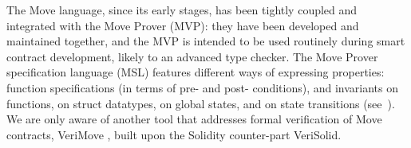 
The Move language, since its early stages, has been tightly coupled and integrated with the Move Prover (MVP): they have been developed and maintained together, and the MVP is intended to be used routinely during smart contract development, likely to an advanced type checker.
The Move Prover specification language (MSL) \cite{aptos-msl,Xu24langsec} features different ways of expressing properties: function specifications (in terms of pre- and post- conditions), and invariants on functions, on struct datatypes, on global states, and on state transitions (see~).
%
We are only aware of  another tool that addresses formal verification of Move contracts, VeriMove \cite{VeriMove}, built upon the Solidity counter-part VeriSolid.%




